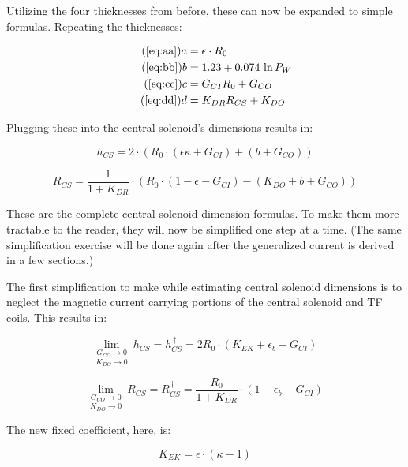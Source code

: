 Utilizing the four thicknesses from before, these can now be expanded to simple formulas. Repeating the thicknesses:

\begin{align}
	\tag{\ref{eq:aa}}
	a &= \epsilon \cdot R_0 \\
	\tag{\ref{eq:bb}}
	b &= 1.23 + 0.074 \ \textnormal{ln} \, P_W \\
	\tag{\ref{eq:cc}}
	c &= G_{CI} R_0 + G_{CO} \\
 	\tag{\ref{eq:dd}}
	d &= K_{DR} R_{CS} + K_{DO} 
\end{align}

Plugging these into the central solenoid's dimensions results in:

\begin{equation}
	h_{CS} = 2 \cdot \left( R_0 \cdot \left( \epsilon \kappa + G_{CI} \right) + \left( b + G_{CO} \right) \right)
\end{equation}

\begin{equation}
	R_{CS} = \frac{ 1 }{ 1 + K_{DR} } \cdot \left( R_0 \cdot \left( 1 - \epsilon - G_{CI}  \right) - \left( K_{DO} + b + G_{CO}  \right) \right)
\end{equation}

These are the complete central solenoid dimension formulas. To make them more tractable to the reader, they will now be simplified one step at a time. (The same simplification exercise will be done again after the generalized current is derived in a few sections.)

The first simplification to make while estimating central solenoid dimensions is to neglect the magnetic current carrying portions of the central solenoid and TF coils. This results in:

\begin{equation}
	\underset{K_{DO} \to 0}{\underset{G_{CO} \to 0}{\lim}} \ h_{CS} = h_{CS}^{\,\dagger} = 2 R_0 \cdot \left( K_{EK} + \epsilon_b + G_{CI} \right) 
\end{equation}

\begin{equation}
	\underset{K_{DO} \to 0}{\underset{G_{CO} \to 0}{\lim}} \ R_{CS} = R_{CS}^{\,\dagger} = \frac{ R_0 }{ 1 + K_{DR} } \cdot \left( 1 - \epsilon_b - G_{CI}  \right)
\end{equation}

The new fixed coefficient, here, is:

\begin{equation}
	K_{EK} = \epsilon \cdot \left( \kappa - 1 \right)
\end{equation}


